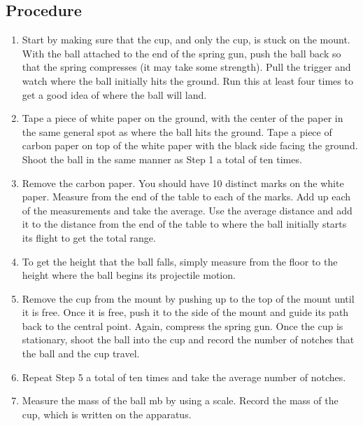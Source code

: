 \documentclass{report}
\begin{document}
    \subsection{Procedure}
    \begin{enumerate}
        \item Start by making sure that the cup, and only the cup, is stuck on the mount. With the ball attached to the end of the spring gun, push the ball back so that the spring compresses (it may take some strength). Pull the trigger and watch where the ball initially hits the ground. Run this at least four times to get a good idea of where the ball will land.
        \item Tape a piece of white paper on the ground, with the center of the paper in the same general spot as where the ball hits the ground. Tape a piece of carbon paper on top of the white paper with the black side facing the ground. Shoot the ball in the same manner as Step 1 a total of ten times.
        \item Remove the carbon paper. You should have 10 distinct marks on the white paper. Measure from the end of the table to each of the marks. Add up each of the measurements and take the average. Use the average distance and add it to the distance from the end of the table to where the ball initially starts its flight to get the total range.
        \item To get the height that the ball falls, simply measure from the floor to the height where the ball begins its projectile motion.
        \item Remove the cup from the mount by pushing up to the top of the mount until it is free. Once it is free, push it to the side of the mount and guide its path back to the central point. Again, compress the spring gun. Once the cup is stationary, shoot the ball into the cup and record the number of notches that the ball and the cup travel.
        \item Repeat Step 5 a total of ten times and take the average number of notches.
        \item Measure the mass of the ball mb by using a scale. Record the mass of the cup, which is written on the apparatus.
    \end{enumerate}







    \pagebreak 
\end{document}

